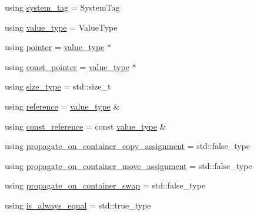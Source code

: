 \begin{DoxyCompactItemize}
\item 
using \hyperlink{structbc_1_1allocators_1_1Basic__Allocator__Base_a625be36f2aedbec274f8524ac72c8d28}{system\+\_\+tag} = System\+Tag
\item 
using \hyperlink{structbc_1_1allocators_1_1Basic__Allocator__Base_a7d9eca7878880a820908b57bdcb94501}{value\+\_\+type} = Value\+Type
\item 
using \hyperlink{structbc_1_1allocators_1_1Basic__Allocator__Base_aa91ec01a2520836062d1c21eb710a3cc}{pointer} = \hyperlink{structbc_1_1allocators_1_1Basic__Allocator__Base_a7d9eca7878880a820908b57bdcb94501}{value\+\_\+type} $\ast$
\item 
using \hyperlink{structbc_1_1allocators_1_1Basic__Allocator__Base_ac6e458ef842011190bc702a5e373850a}{const\+\_\+pointer} = \hyperlink{structbc_1_1allocators_1_1Basic__Allocator__Base_a7d9eca7878880a820908b57bdcb94501}{value\+\_\+type} $\ast$
\item 
using \hyperlink{structbc_1_1allocators_1_1Basic__Allocator__Base_ad7fe7255772b954d581c75ae2ee0d959}{size\+\_\+type} = std\+::size\+\_\+t
\item 
using \hyperlink{structbc_1_1allocators_1_1Basic__Allocator__Base_a9900b1de8ba282c40f6b5c3576f39b35}{reference} = \hyperlink{structbc_1_1allocators_1_1Basic__Allocator__Base_a7d9eca7878880a820908b57bdcb94501}{value\+\_\+type} \&
\item 
using \hyperlink{structbc_1_1allocators_1_1Basic__Allocator__Base_a5b5edb3ecfd3e5e210f95a9349ed4676}{const\+\_\+reference} = const \hyperlink{structbc_1_1allocators_1_1Basic__Allocator__Base_a7d9eca7878880a820908b57bdcb94501}{value\+\_\+type} \&
\item 
using \hyperlink{structbc_1_1allocators_1_1Basic__Allocator__Base_ae33a042e54a5257608e3e354a6890edc}{propagate\+\_\+on\+\_\+container\+\_\+copy\+\_\+assignment} = std\+::false\+\_\+type
\item 
using \hyperlink{structbc_1_1allocators_1_1Basic__Allocator__Base_a7c726fe1953f8dcb66e515edcf0d52ef}{propagate\+\_\+on\+\_\+container\+\_\+move\+\_\+assignment} = std\+::false\+\_\+type
\item 
using \hyperlink{structbc_1_1allocators_1_1Basic__Allocator__Base_a43d9999061677b23d0d03a56427e39f5}{propagate\+\_\+on\+\_\+container\+\_\+swap} = std\+::false\+\_\+type
\item 
using \hyperlink{structbc_1_1allocators_1_1Basic__Allocator__Base_a93df6b95cdc21c0d35bd34450d260a62}{is\+\_\+always\+\_\+equal} = std\+::true\+\_\+type
\end{DoxyCompactItemize}
